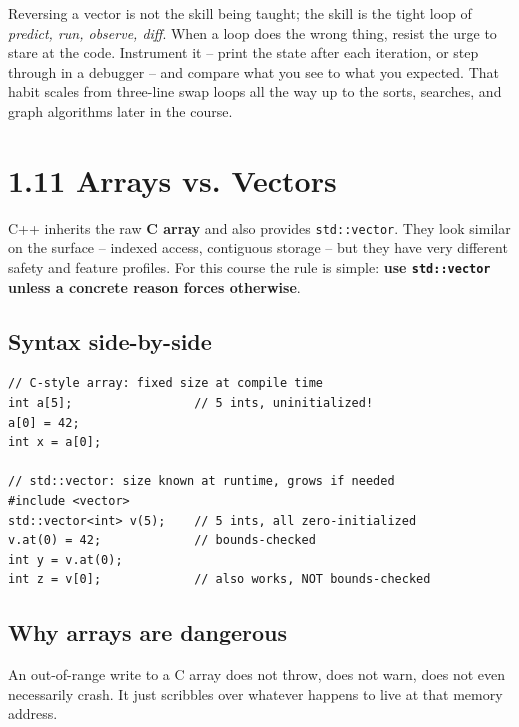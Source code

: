 \documentclass[11pt]{article}
\begin{document}
\begin{ideabox}
Reversing a vector is not the skill being taught; the skill is the
tight loop of \emph{predict, run, observe, diff}. When a loop does the
wrong thing, resist the urge to stare at the code. Instrument it --
print the state after each iteration, or step through in a debugger --
and compare what you see to what you expected. That habit scales from
three-line swap loops all the way up to the sorts, searches, and graph
algorithms later in the course.
\end{ideabox}

\section{1.11 Arrays vs. Vectors}

C++ inherits the raw \textbf{C array} and also provides
\texttt{std::vector}. They look similar on the surface -- indexed access,
contiguous storage -- but they have very different safety and feature
profiles. For this course the rule is simple: \textbf{use
\texttt{std::vector} unless a concrete reason forces otherwise}.

\subsection{Syntax side-by-side}

\begin{examplebox}
\begin{verbatim}
// C-style array: fixed size at compile time
int a[5];                 // 5 ints, uninitialized!
a[0] = 42;
int x = a[0];

// std::vector: size known at runtime, grows if needed
#include <vector>
std::vector<int> v(5);    // 5 ints, all zero-initialized
v.at(0) = 42;             // bounds-checked
int y = v.at(0);
int z = v[0];             // also works, NOT bounds-checked
\end{verbatim}
\end{examplebox}

\subsection{Why arrays are dangerous}

An out-of-range write to a C array does not throw, does not warn, does
not even necessarily crash. It just scribbles over whatever happens to
live at that memory address.
\end{document}

